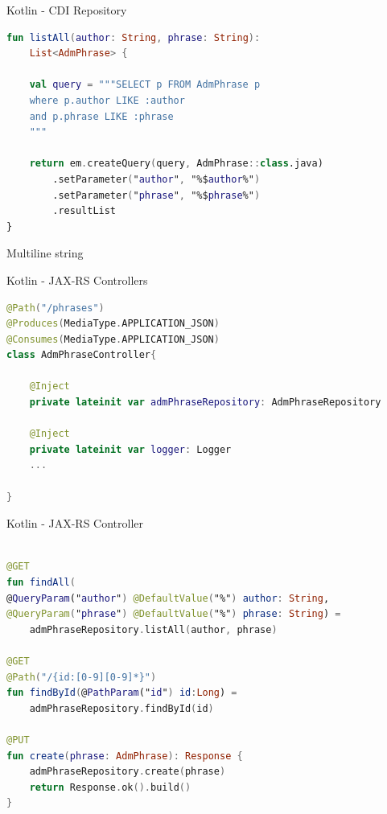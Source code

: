 \documentclass[aspectratio=169]{beamer}
\begin{document}
\begin{frame}[fragile]{Kotlin - CDI Repository}
\begin{lstlisting}[language=Kotlin]
fun listAll(author: String, phrase: String):
    List<AdmPhrase> {
    
    val query = """SELECT p FROM AdmPhrase p
    where p.author LIKE :author
    and p.phrase LIKE :phrase
    """
    
    return em.createQuery(query, AdmPhrase::class.java)
        .setParameter("author", "%$author%")
        .setParameter("phrase", "%$phrase%")
        .resultList
}
\end{lstlisting}
Multiline string
\end{frame}

\begin{frame}[fragile]{Kotlin - JAX-RS Controllers}
\begin{lstlisting}[language=Kotlin, basicstyle=\scriptsize\ttfamily]
@Path("/phrases")
@Produces(MediaType.APPLICATION_JSON)
@Consumes(MediaType.APPLICATION_JSON)
class AdmPhraseController{

    @Inject
    private lateinit var admPhraseRepository: AdmPhraseRepository
    
    @Inject
    private lateinit var logger: Logger
    ...

}
\end{lstlisting}
\end{frame}

\begin{frame}[fragile]{Kotlin - JAX-RS Controller}
\begin{lstlisting}[language=Kotlin, basicstyle=\scriptsize\ttfamily]

@GET
fun findAll(
@QueryParam("author") @DefaultValue("%") author: String,
@QueryParam("phrase") @DefaultValue("%") phrase: String) =
    admPhraseRepository.listAll(author, phrase)

@GET
@Path("/{id:[0-9][0-9]*}")
fun findById(@PathParam("id") id:Long) =
    admPhraseRepository.findById(id)

@PUT
fun create(phrase: AdmPhrase): Response {
    admPhraseRepository.create(phrase)
    return Response.ok().build()
}
\end{lstlisting}
\end{frame}
\end{document}
